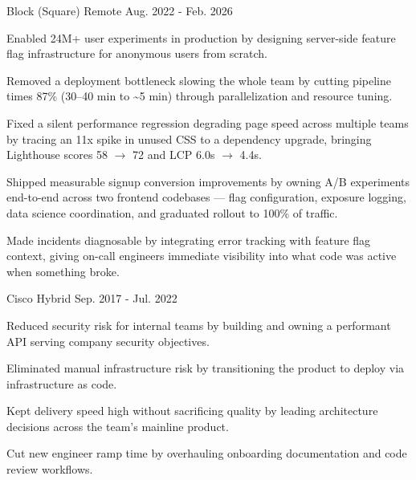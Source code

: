 \begin{cventries}
    {Block (Square)} %
    {Remote} %
    {Aug. 2022 - Feb. 2026} %
    {
      \begin{cvitems}
        \item {Enabled 24M+ user experiments in production by designing server-side feature flag infrastructure for anonymous users from scratch.}
        \item {Removed a deployment bottleneck slowing the whole team by cutting pipeline times 87\% (30--40 min to \textasciitilde5 min) through parallelization and resource tuning.}
        \item {Fixed a silent performance regression degrading page speed across multiple teams by tracing an 11x spike in unused CSS to a dependency upgrade, bringing Lighthouse scores 58 $\rightarrow$ 72 and LCP 6.0s $\rightarrow$ 4.4s.}
        \item {Shipped measurable signup conversion improvements by owning A/B experiments end-to-end across two frontend codebases — flag configuration, exposure logging, data science coordination, and graduated rollout to 100\% of traffic.}
        \item {Made incidents diagnosable by integrating error tracking with feature flag context, giving on-call engineers immediate visibility into what code was active when something broke.}
      \end{cvitems}
    }

    {Cisco} %
    {Hybrid} %
    {Sep. 2017 - Jul. 2022} %
    {
      \begin{cvitems}
        \item {Reduced security risk for internal teams by building and owning a performant API serving company security objectives.}
        \item {Eliminated manual infrastructure risk by transitioning the product to deploy via infrastructure as code.}
        \item {Kept delivery speed high without sacrificing quality by leading architecture decisions across the team's mainline product.}
        \item {Cut new engineer ramp time by overhauling onboarding documentation and code review workflows.}
      \end{cvitems}
    }


\end{cventries}
